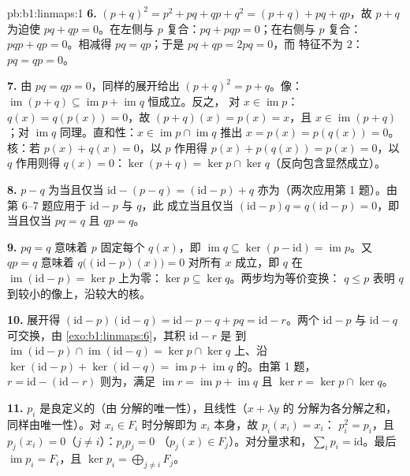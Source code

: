 \begin{solution}{pb:b1:linmaps:1}
\textbf{6.} $(p + q)^2 = p^2 + pq + qp + q^2 = (p + q) + pq +
qp$，故 $p + q$ 为迫使 $pq + qp = 0$。在左侧与
$p$ 复合：$pq + pqp = 0$；在右侧与 $p$ 复合：$pqp + qp
= 0$。相减得 $pq = qp$；于是 $pq + qp = 2pq = 0$，而
特征不为 $2$：$pq = qp = 0$。

\textbf{7.} 由 $pq = qp = 0$，同样的展开给出 $(p +
q)^2 = p + q$。像：$\operatorname{im}(p + q) \subseteq
\operatorname{im} p + \operatorname{im} q$ 恒成立。反之，
对 $x \in \operatorname{im} p$：$q(x) = q(p(x)) = 0$，故 $(p +
q)(x) = p(x) = x$，且 $x \in \operatorname{im}(p+q)$；对
$\operatorname{im} q$ 同理。直和性：$x \in \operatorname{im} p
\cap \operatorname{im} q$ 推出 $x = p(x) = p(q(x)) = 0$。
核：若 $p(x) + q(x) = 0$，以 $p$ 作用得 $p(x) +
p(q(x)) = p(x) = 0$，以 $q$ 作用则得 $q(x) = 0$：$\ker(p
+ q) = \ker p \cap \ker q$（反向包含显然成立）。

\textbf{8.} $p - q$ 为当且仅当 $\mathrm{id} - (p - q) =
(\mathrm{id} - p) + q$ 亦为（两次应用第 1 题）。由
第 6--7 题应用于 $\mathrm{id} - p$ 与 $q$，此
成立当且仅当 $(\mathrm{id} - p)q = q(\mathrm{id} - p) = 0$，即
当且仅当 $pq = q$ 且 $qp = q$。

\textbf{9.} $pq = q$ 意味着 $p$ 固定每个 $q(x)$，即
$\operatorname{im} q \subseteq \ker(p - \mathrm{id}) =
\operatorname{im} p$。又 $qp = q$ 意味着 $q\bigl((\mathrm{id} -
p)(x)\bigr) = 0$ 对所有 $x$ 成立，即 $q$ 在
$\operatorname{im}(\mathrm{id} - p) = \ker p$ 上为零：$\ker p \subseteq
\ker q$。两步均为等价变换： $q \leq p$ 表明
$q$ 到较小的像上，沿较大的核。

\textbf{10.} 展开得 $(\mathrm{id} - p)(\mathrm{id} - q) =
\mathrm{id} - p - q + pq = \mathrm{id} - r$。两个
$\mathrm{id} - p$ 与 $\mathrm{id} - q$ 可交换，由
\cref{exo:b1:linmaps:6}，其积 $\mathrm{id} - r$ 是
到 $\operatorname{im}(\mathrm{id} - p) \cap
\operatorname{im}(\mathrm{id} - q) = \ker p \cap \ker q$ 上、沿
$\ker(\mathrm{id} - p) + \ker(\mathrm{id} - q) =
\operatorname{im} p + \operatorname{im} q$ 的。由第 1 题，$r =
\mathrm{id} - (\mathrm{id} - r)$ 则为，满足
$\operatorname{im} r = \operatorname{im} p + \operatorname{im}
q$ 且 $\ker r = \ker p \cap \ker q$。

\textbf{11.} $p_i$ 是良定义的（由
分解的唯一性），且线性（$x + \lambda y$ 的
分解为各分解之和，同样由唯一性）。对 $x_i
\in F_i$ 时分解即为 $x_i$ 本身，故 $p_i(x_i) = x_i$：
$p_i^2 = p_i$，且 $p_j(x_i) = 0$（$j \neq i$）：$p_i p_j = 0$
（$p_j(x) \in F_j$）。对分量求和，$\sum_i p_i =
\mathrm{id}$。最后 $\operatorname{im} p_i = F_i$，且 $\ker
p_i = \bigoplus_{j \neq i} F_j$。


\end{solution}
